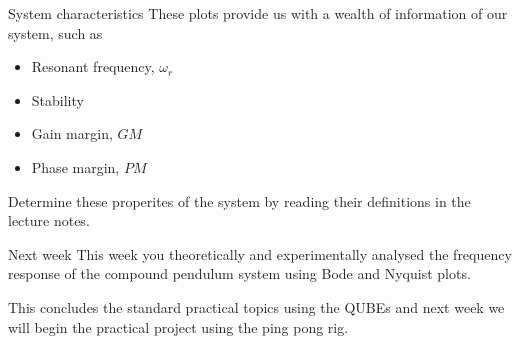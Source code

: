 \documentclass[9pt]{beamer-control}
\begin{document}
\begin{frame}{System characteristics}
  These plots provide us with a wealth of information of our system, such as
  \begin{itemize}
    \item Resonant frequency, $\omega_r$
    \item Stability
    \item Gain margin, $GM$
    \item Phase margin, $PM$
  \end{itemize}
  Determine these properites of the system by reading their definitions in the lecture notes.


\end{frame}


\begin{frame}{Next week}
  This week you theoretically and experimentally analysed the frequency response of the compound pendulum system using Bode and Nyquist plots.

  This concludes the standard practical topics using the QUBEs and next week we will begin the practical project using the ping pong rig.
\end{frame}
\end{document}
